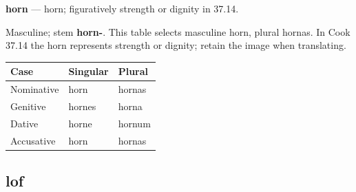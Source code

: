 \par\begin{minipage}{\linewidth}\raggedright
\textbf{horn} — horn; figuratively strength or dignity in 37.14.

Masculine; stem \textbf{horn-}. This table selects masculine horn, plural hornas. In Cook 37.14 the horn represents strength or dignity; retain the image when translating.

\par\begingroup
\fontsize{10.5}{13.2}\selectfont
\setlength{\LTleft}{0pt}\setlength{\LTright}{\fill}
\noindent
\begin{tabular}{@{}>{\raggedright\arraybackslash}p{39.46mm}>{\raggedright\arraybackslash}p{39.46mm}>{\raggedright\arraybackslash}p{39.46mm}@{}}
\toprule
\textbf{Case} & \textbf{Singular} & \textbf{Plural} \\
\midrule
Nominative & horn & hornas \\
Genitive & hornes & horna \\
Dative & horne & hornum \\
Accusative & horn & hornas \\
\bottomrule
\end{tabular}
\par\endgroup

\end{minipage}\par
{}
\subsection*{lof}

